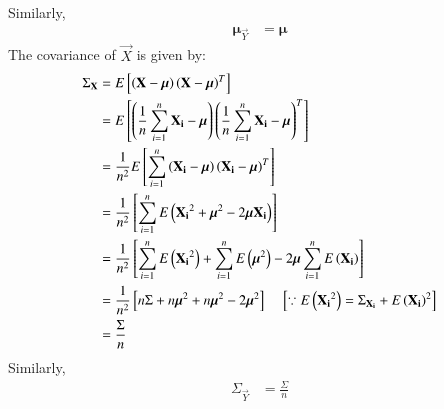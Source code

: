 \documentclass[journal,12pt,onecolumn]{IEEEtran}
\theoremstyle{remark}
\begin{document}
Similarly,
\begin{align}
{\bm{\mu}}_{\vec{Y}} &= \bm{\mu}
\end{align}
The covariance of $\vec{X}$ is given by: 
\begin{align}
\Sigma_{\mathbf{X}} &= E{}\left[\left(\mathbf{X}-\bm{\mu}\right){\left(\mathbf{X}-\bm{\mu}\right)}^T\right] \\
                 &= E{}\left[\left(\frac{1}{n}\sum_{i=1}^{n}\mathbf{X_i}-\bm{\mu}\right){\left(\frac{1}{n}\sum_{i=1}^{n}\mathbf{X_i}-\bm{\mu}\right)}^T\right] \\
                 &= \frac{1}{n^2}E{}\left[\sum_{i=1}^{n}\left(\mathbf{X_i}-\bm{\mu}\right){\left(\mathbf{X_i}-\bm{\mu}\right)}^T\right] \\
                 &= \frac{1}{n^2}{}\left[\sum_{i=1}^{n}E\left({\mathbf{X_i}}^2+{\bm{\mu}}^2-2\bm{\mu}\mathbf{X_i}\right)\right] \\
                 &= \frac{1}{n^2}{}\left[\sum_{i=1}^{n}E\left({\mathbf{X_i}}^2\right)+\sum_{i=1}^{n}E\left({\bm{\mu}}^2\right)-2\bm{\mu}\sum_{i=1}^{n}E\left(\mathbf{X_i}\right)\right] \\
                 &= \frac{1}{n^2}{}\left[n\Sigma+n{\bm{\mu}}^2+n{\bm{\mu}}^2-2{\bm{\mu}}^2\right] \quad {}\left[\because E\left({\mathbf{X_i}}^2\right)={\Sigma}_{\mathbf{X_i}}+{E\left(\mathbf{X_i}\right)}^2\right] \\
                 &= \frac{\Sigma}{n}         
\end{align}
Similarly,
\begin{align}
\Sigma_{\vec{Y}} &= \frac{\Sigma}{n} 
\end{align}
\end{document}
